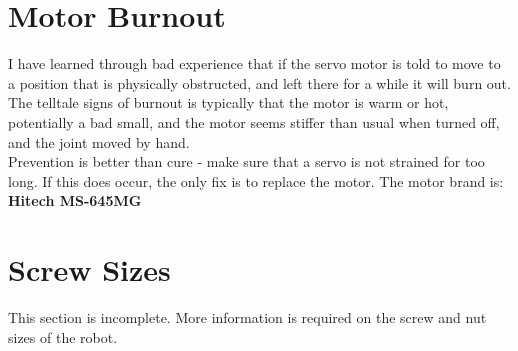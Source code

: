         \section{Motor Burnout}
        	\label{motor_failure}
        	I have learned through bad experience that if the servo motor is told to move to a position that is physically obstructed, and left there for a while it will burn out.\\
            
            The telltale signs of burnout is typically that the motor is warm or hot, potentially a bad small, and the motor seems stiffer than usual when turned off, and the joint moved by hand.\\
            
            Prevention is better than cure - make sure that a servo is not strained for too long. If this does occur, the only fix is to replace the motor. The motor brand is:\\
            
            \textbf{Hitech MS-645MG}\\
            
        \section{Screw Sizes}
        	This section is incomplete. More information is required on the screw and nut sizes of the robot.\\
            
            